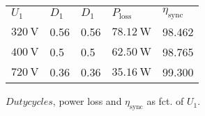 
\begin{solutiontable}[ht]
    \centering  %
    \begin{tabular}{lllll}
        \toprule
        
        $U_\mathrm{1}$ & $D_1$   &  $D_1$ & $P_\mathrm{loss}$      & $\eta_\mathrm{sync}$ \\ 
        $\SI{320}{\volt}$ & 0.56 &  0.56  & $\SI{78.12}{\watt}$ & 98.462 \\ 
        $\SI{400}{\volt}$ & 0.5  &  0.5   & $\SI{62.50}{\watt}$ & 98.765 \\ 
        $\SI{720}{\volt}$ & 0.36 &  0.36  & $\SI{35.16}{\watt}$ & 99.300 \\ 
        \bottomrule
    \end{tabular}
    \caption{$Dutycycles$, power loss and $\eta_\mathrm{sync}$ as fct. of $U_\mathrm{1}$.}     
\end{solutiontable}
